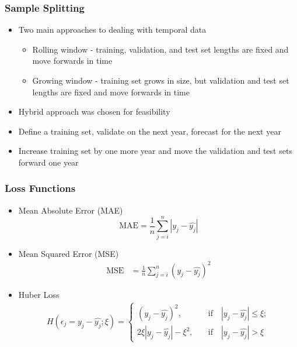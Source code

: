 \documentclass{beamer}
\begin{document}
\begin{frame}
\frametitle{Sample Splitting}
\begin{itemize}
	\item Two main approaches to dealing with temporal data
	\begin{itemize}
		\item Rolling window - training, validation, and test set lengths are fixed and move forwards in time
		\item Growing window - training set grows in size, but validation and test set lengths are fixed and move forwards in time
	\end{itemize}
	\item Hybrid approach was chosen for feasibility
	\item Define a training set, validate on the next year, forecast for the next year
	\item Increase training set by one more year and move the validation and test sets forward one year
\end{itemize}
\end{frame}

\begin{frame}
\frametitle{Loss Functions}
\begin{itemize}
	\item Mean Absolute Error (MAE)
		\begin{equation}
		\text{MAE} = \frac{1}{n} \sum_{j = i}^{n} |y_j - \hat{y_j}|
		\end{equation}
	\item Mean Squared Error (MSE)
		\begin{align}
		\text{MSE} &= \frac{1}{n} \sum_{j = i}^{n} \left( y_j - \hat{y_j}\right) ^2
		\end{align}
	\item Huber Loss
		\begin{align}
		H(\epsilon_j = y_j - \hat{y_j};\xi) = 
		\begin{cases}
		\left( y_j - \hat{y_j}\right) ^2, 
		\quad &\text{if} \quad |y_j - \hat{y_j}| \leq \xi ; \\
		2 \xi  |y_j - \hat{y_j}| - \xi^2, 
		\quad &\text{if} \quad |y_j - \hat{y_j}| > \xi
		\end{cases}
		\end{align}
\end{itemize}
\end{frame}
\end{document}

